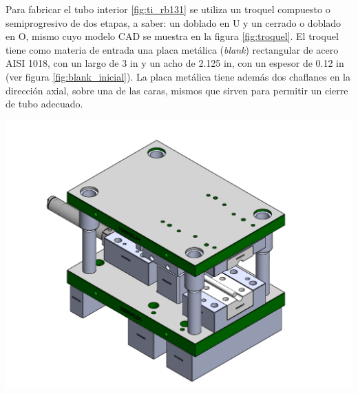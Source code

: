 Para fabricar el tubo interior \ref{fig:ti_rb131} se utiliza un troquel compuesto o semiprogresivo 
de dos etapas, a saber: un doblado en U y un cerrado o doblado en O, mismo cuyo modelo CAD se muestra 
en la figura \ref{fig:troquel}. El troquel tiene como materia de entrada una placa metálica 
(\textit{blank}) rectangular de acero AISI 1018, con un largo de 3 in y un acho de 2.125 in, 
con un espesor de 0.12 in (ver figura \ref{fig:blank_inicial}). La placa metálica tiene además 
dos chaflanes en la dirección axial, sobre una de las caras, mismos que sirven para permitir un 
cierre de tubo adecuado.



\begin{center}
\includegraphics[scale=0.4]{src/ch3/troquel.pdf}
\label{fig:troquel}
\end{center}

